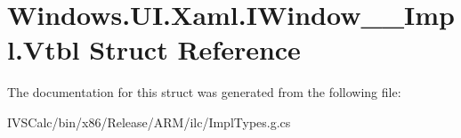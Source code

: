 \hypertarget{struct_windows_1_1_u_i_1_1_xaml_1_1_i_window_____impl_1_1_vtbl}{}\section{Windows.\+U\+I.\+Xaml.\+I\+Window\+\_\+\+\_\+\+Impl.\+Vtbl Struct Reference}
\label{struct_windows_1_1_u_i_1_1_xaml_1_1_i_window_____impl_1_1_vtbl}


The documentation for this struct was generated from the following file\+:\begin{DoxyCompactItemize}
\item 
I\+V\+S\+Calc/bin/x86/\+Release/\+A\+R\+M/ilc/Impl\+Types.\+g.\+cs\end{DoxyCompactItemize}
